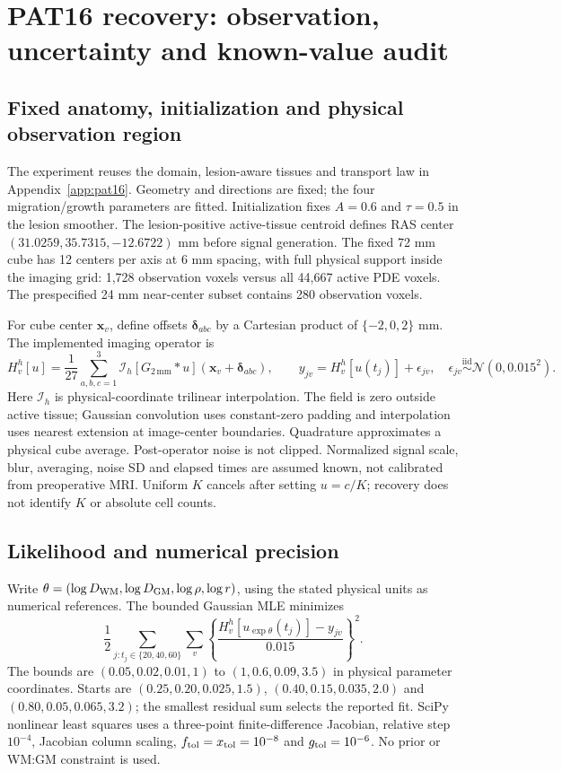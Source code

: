 \section{PAT16 recovery: observation, uncertainty and known-value audit}\label{app:pat16_recovery}
\subsection{Fixed anatomy, initialization and physical observation region}
The experiment reuses the domain, lesion-aware tissues and transport law in Appendix~\ref{app:pat16}. Geometry and directions are fixed; the four migration/growth parameters are fitted. Initialization fixes $A=0.6$ and $\tau=0.5$ in the lesion smoother. The lesion-positive active-tissue centroid defines RAS center $(31.0259,35.7315,-12.6722)$ mm before signal generation. The fixed 72 mm cube has 12 centers per axis at 6 mm spacing, with full physical support inside the imaging grid: 1,728 observation voxels versus all 44,667 active PDE voxels. The prespecified 24 mm near-center subset contains 280 observation voxels.

For cube center $\bm x_v$, define offsets $\bm\delta_{abc}$ by a Cartesian product of $\{-2,0,2\}$ mm. The implemented imaging operator is
\begin{equation}
 H_v^h[u]=\frac{1}{27}\sum_{a,b,c=1}^{3}
 \mathcal I_h\!\left[G_{2\,\mathrm{mm}}*u\right](\bm x_v+\bm\delta_{abc}),\qquad
 y_{jv}=H_v^h[u(t_j)]+\epsilon_{jv},\quad
 \epsilon_{jv}\overset{\mathrm{iid}}{\sim}\mathcal N(0,0.015^2).
\end{equation}
Here $\mathcal I_h$ is physical-coordinate trilinear interpolation. The field is zero outside active tissue; Gaussian convolution uses constant-zero padding and interpolation uses nearest extension at image-center boundaries. Quadrature approximates a physical cube average. Post-operator noise is not clipped. Normalized signal scale, blur, averaging, noise SD and elapsed times are assumed known, not calibrated from preoperative MRI. Uniform $K$ cancels after setting $u=c/K$; recovery does not identify $K$ or absolute cell counts.

\subsection{Likelihood and numerical precision}
Write $\theta=(\log D_{\rm WM},\log D_{\rm GM},\log\rho,\log r)$, using the stated physical units as numerical references. The bounded Gaussian MLE minimizes
\begin{equation}
 \frac12\sum_{j:t_j\in\{20,40,60\}}\sum_v
 \left\{\frac{H_v^h[u_{\exp\theta}(t_j)]-y_{jv}}{0.015}\right\}^2.
\end{equation}
The bounds are $(0.05,0.02,0.01,1)$ to $(1,0.6,0.09,3.5)$ in physical parameter coordinates. Starts are $(0.25,0.20,0.025,1.5)$, $(0.40,0.15,0.035,2.0)$ and $(0.80,0.05,0.065,3.2)$; the smallest residual sum selects the reported fit. SciPy nonlinear least squares uses a three-point finite-difference Jacobian, relative step $10^{-4}$, Jacobian column scaling, $f_{\rm tol}=x_{\rm tol}=10^{-8}$ and $g_{\rm tol}=10^{-6}$. No prior or WM:GM constraint is used.

